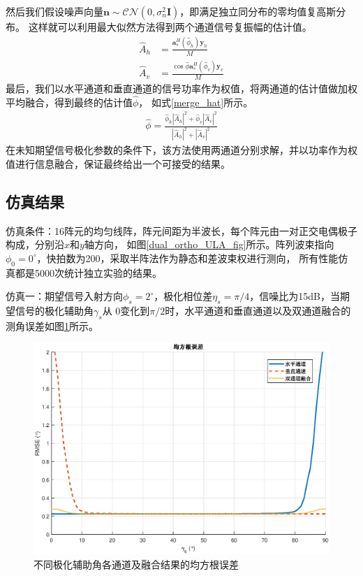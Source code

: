 \documentclass[master]{thesis-uestc}
\begin{document}
然后我们假设噪声向量$\bm{n}\sim\mathcal{CN}(0,\sigma_n^2\bm{I})$，即满足独立同分布的零均值复高斯分布。
这样就可以利用最大似然方法得到两个通道信号复振幅的估计值。
\begin{subequations}\label{dual_amp_hat}
    \begin{align}
        \hat{A}_h &= \frac{\bm{a}_s^H(\hat{\phi}_h)\bm{y}_h}{M} \\
        \hat{A}_v &= \frac{\cos\hat{\phi}\bm{a}_s^H(\hat{\phi}_v)\bm{y}_v}{M}
    \end{align}
\end{subequations}
最后，我们以水平通道和垂直通道的信号功率作为权值，将两通道的估计值做加权平均融合，得到最终的估计值$\hat{\phi}$，
如式\eqref{merge_hat}所示。
\begin{equation}\label{merge_hat}
    \begin{aligned}
        \hat{\phi} = 
        \frac{\hat{\phi}_h\left|\hat{A}_h\right|^2+\hat{\phi}_v\left|\hat{A}_v\right|^2}
        {\left|\hat{A}_h\right|^2+\left|\hat{A}_v\right|^2}
    \end{aligned}
\end{equation}
在未知期望信号极化参数的条件下，该方法使用两通道分别求解，并以功率作为权值进行信息融合，保证最终给出一个可接受的结果。

\subsection{仿真结果}
仿真条件：16阵元的均匀线阵，阵元间距为半波长，每个阵元由一对正交电偶极子构成，分别沿$x$和$y$轴方向，
如图\ref{dual_ortho_ULA_fig}所示。阵列波束指向$\phi_0=0^\circ$，快拍数为200，采取半阵法作为静态和差波束权进行测向，
所有性能仿真都是5000次统计独立实验的结果。

仿真一：期望信号入射方向$\phi_s=2^\circ$，极化相位差$\eta_s=\pi/4$，信噪比为15dB，当期望信号的极化辅助角$\gamma_s$从
$0$变化到$\pi/2$时，水平通道和垂直通道以及双通道融合的测角误差如图\ref{dual_RMSE_gamma}所示。
\begin{figure}[H]
    \includegraphics[scale=0.5]{pic/dual_RMSE_gamma.eps}
    \caption{不同极化辅助角各通道及融合结果的均方根误差}
    \label{dual_RMSE_gamma}
\end{figure}
\end{document}
